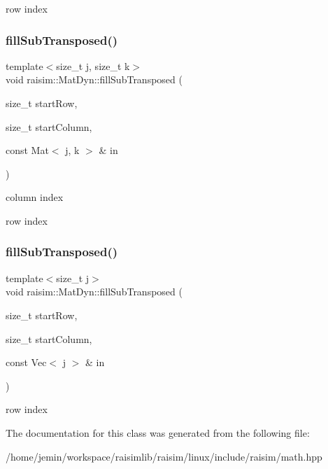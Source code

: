 row index \mbox{\label{classraisim_1_1MatDyn_a4bcc7fd38fa50cfb3dad05f91a5f4540}} 
\subsubsection{\texorpdfstring{fill\+Sub\+Transposed()}{fillSubTransposed()}\hspace{0.1cm}{\footnotesize\ttfamily [1/2]}}
{\footnotesize\ttfamily template$<$size\+\_\+t j, size\+\_\+t k$>$ \\
void raisim\+::\+Mat\+Dyn\+::fill\+Sub\+Transposed (\begin{DoxyParamCaption}\item[{size\+\_\+t}]{start\+Row,  }\item[{size\+\_\+t}]{start\+Column,  }\item[{const Mat$<$ j, k $>$ \&}]{in }\end{DoxyParamCaption})\hspace{0.3cm}{\ttfamily [inline]}}

column index

row index \mbox{\label{classraisim_1_1MatDyn_af51f76085457af3e3a3671d95945b493}} 
\subsubsection{\texorpdfstring{fill\+Sub\+Transposed()}{fillSubTransposed()}\hspace{0.1cm}{\footnotesize\ttfamily [2/2]}}
{\footnotesize\ttfamily template$<$size\+\_\+t j$>$ \\
void raisim\+::\+Mat\+Dyn\+::fill\+Sub\+Transposed (\begin{DoxyParamCaption}\item[{size\+\_\+t}]{start\+Row,  }\item[{size\+\_\+t}]{start\+Column,  }\item[{const Vec$<$ j $>$ \&}]{in }\end{DoxyParamCaption})\hspace{0.3cm}{\ttfamily [inline]}}

row index 

The documentation for this class was generated from the following file\+:\begin{DoxyCompactItemize}
\item 
/home/jemin/workspace/raisimlib/raisim/linux/include/raisim/math.\+hpp\end{DoxyCompactItemize}

